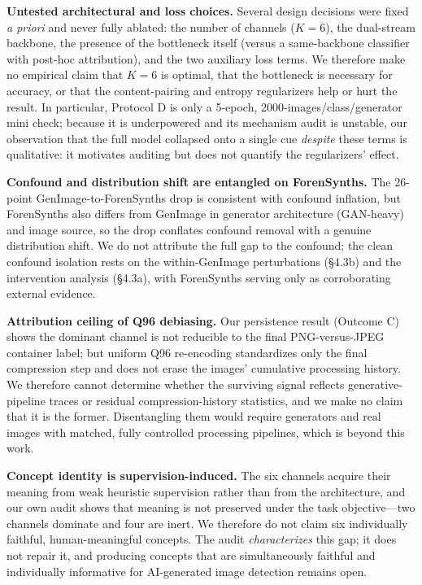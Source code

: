 \textbf{Untested architectural and loss choices.} Several design decisions were fixed \emph{a priori} and never fully ablated: the number of channels (\(K{=}6\)), the dual-stream backbone, the presence of the bottleneck itself (versus a same-backbone classifier with post-hoc attribution), and the two auxiliary loss terms. We therefore make no empirical claim that \(K{=}6\) is optimal, that the bottleneck is necessary for accuracy, or that the content-pairing and entropy regularizers help or hurt the result. In particular, Protocol D is only a 5-epoch, 2000-images/class/generator mini check; because it is underpowered and its mechanism audit is unstable, our observation that the full model collapsed onto a single cue \emph{despite} these terms is qualitative: it motivates auditing but does not quantify the regularizers' effect.

\textbf{Confound and distribution shift are entangled on ForenSynths.} The 26-point GenImage-to-ForenSynths drop is consistent with confound inflation, but ForenSynths also differs from GenImage in generator architecture (GAN-heavy) and image source, so the drop conflates confound removal with a genuine distribution shift. We do not attribute the full gap to the confound; the clean confound isolation rests on the within-GenImage perturbations (\S{}4.3b) and the intervention analysis (\S{}4.3a), with ForenSynths serving only as corroborating external evidence.

\textbf{Attribution ceiling of Q96 debiasing.} Our persistence result (Outcome C) shows the dominant channel is not reducible to the final PNG-versus-JPEG container label; but uniform Q96 re-encoding standardizes only the final compression step and does not erase the images' cumulative processing history. We therefore cannot determine whether the surviving signal reflects generative-pipeline traces or residual compression-history statistics, and we make no claim that it is the former. Disentangling them would require generators and real images with matched, fully controlled processing pipelines, which is beyond this work.

\textbf{Concept identity is supervision-induced.} The six channels acquire their meaning from weak heuristic supervision rather than from the architecture, and our own audit shows that meaning is not preserved under the task objective---two channels dominate and four are inert. We therefore do not claim six individually faithful, human-meaningful concepts. The audit \emph{characterizes} this gap; it does not repair it, and producing concepts that are simultaneously faithful and individually informative for AI-generated image detection remains open.


